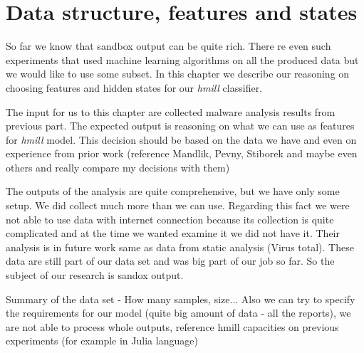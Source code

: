 \chapter{Data structure, features and states}
So far we know that sandbox output can be quite rich. There re even such experiments that used machine learning algorithms on all the produced data but we would like to use some subset. In this chapter we describe our reasoning on choosing features and hidden states for our \emph{hmill} classifier.

The input for us to this chapter are collected malware analysis results from previous part. The expected output is reasoning on what we can use as features for \emph{hmill} model. This decision should be based on the data we have and even on experience from prior work (reference Mandlik, Pevny, Stiborek and maybe even others and really compare my decisions with them)

The outputs of the analysis are quite comprehensive, but we have only some setup. We did collect much more than we can use. Regarding this fact we were not able to use data with internet connection because its collection is quite complicated and at the time we wanted examine it we did not have it. Their analysis is in future work same as data from static analysis (Virus total). These data are still part of our data set and was big part of our job so far. So the subject of our research is sandox output.

Summary of the data set - How many samples, size...
Also we can try to specify the requirements for our model (quite big amount of data - all the reports), we are not able to process whole outputs, reference hmill capacities on previous experiments (for example in Julia language)

